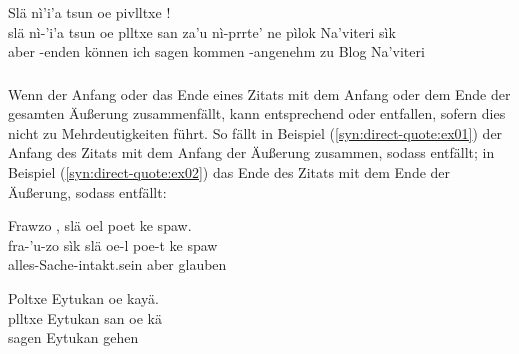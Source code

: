 \begin{interlin}
	\glll \Npawl{}Slä nì'i'a tsun oe pivlltxe       ! \\
	slä nì-'i'a tsun oe plltxe san za'u nì-prrte' ne pìlok Na'viteri sìk \\
	aber -enden können ich sagen  kommen -angenehm zu Blog Na'viteri  \\
\end{interlin}

\subsubsection{} Wenn der Anfang oder das Ende eines Zitats mit dem Anfang oder dem Ende der gesamten Äußerung zusammenfällt, kann entsprechend  oder  entfallen, sofern dies nicht zu Mehrdeutigkeiten führt. So fällt in Beispiel (\ref{syn:direct-quote:ex01}) der Anfang des Zitats mit dem Anfang der Äußerung zusammen, sodass  entfällt; in Beispiel (\ref{syn:direct-quote:ex02}) das Ende des Zitats mit dem Ende der Äußerung, sodass  entfällt:

\begin{interlin} \label{syn:direct-quote:ex01}
	\glll \Npawl{}Frawzo , slä oel poet ke spaw. \\
	fra-'u-zo sìk slä oe-l poe-t ke spaw \\
	alles-Sache-intakt.sein  aber    glauben \\
\end{interlin}

\begin{interlin} \label{syn:direct-quote:ex02}
	\glll Poltxe Eytukan  oe kayä. \\
	plltxe Eytukan san oe kä \\
	sagen Eytukan   gehen \\
\end{interlin}

